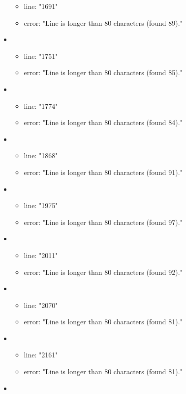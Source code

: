 \begin{itemize}
\begin{itemize}
		\item line: "1691" 
		\item error: "Line is longer than 80 characters (found 89)." 
	\end{itemize}
	\item 
	\begin{itemize} 
		\item line: "1751" 
		\item error: "Line is longer than 80 characters (found 85)." 
	\end{itemize}
	\item 
	\begin{itemize} 
		\item line: "1774" 
		\item error: "Line is longer than 80 characters (found 84)." 
	\end{itemize}
	\item 
	\begin{itemize} 
		\item line: "1868" 
		\item error: "Line is longer than 80 characters (found 91)." 
	\end{itemize}
	\item 
	\begin{itemize} 
		\item line: "1975" 
		\item error: "Line is longer than 80 characters (found 97)." 
	\end{itemize}
	\item 
	\begin{itemize} 
		\item line: "2011" 
		\item error: "Line is longer than 80 characters (found 92)." 
	\end{itemize}
	\item 
	\begin{itemize} 
		\item line: "2070" 
		\item error: "Line is longer than 80 characters (found 81)." 
	\end{itemize}
	\item 
	\begin{itemize} 
		\item line: "2161" 
		\item error: "Line is longer than 80 characters (found 81)." 
	\end{itemize}
	\item 
	\begin{itemize} 

\end{itemize}
\end{itemize}
